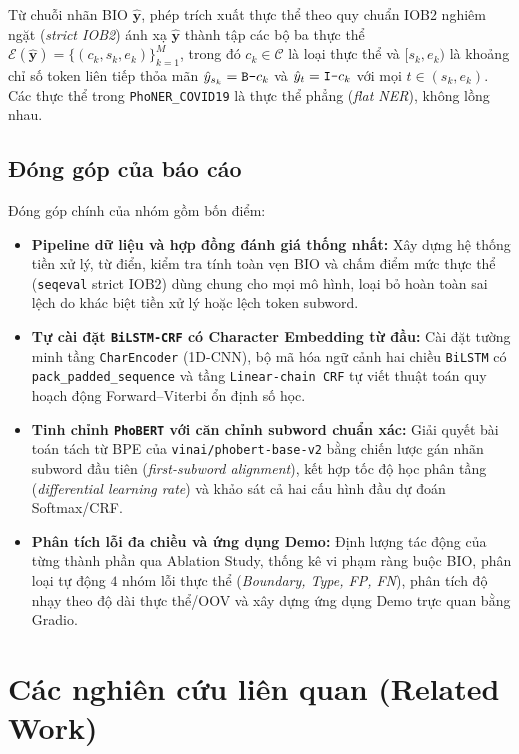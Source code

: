 \documentclass[11pt,a4paper,twocolumn]{article}
\begin{document}
Từ chuỗi nhãn BIO $\hat{\mathbf{y}}$, phép trích xuất thực thể theo quy chuẩn IOB2 nghiêm ngặt (\textit{strict IOB2}) ánh xạ $\hat{\mathbf{y}}$ thành tập các bộ ba thực thể $\mathcal{E}(\hat{\mathbf{y}}) = \{(c_k, s_k, e_k)\}_{k=1}^{M}$, trong đó $c_k \in \mathcal{C}$ là loại thực thể và $[s_k, e_k)$ là khoảng chỉ số token liên tiếp thỏa mãn $\hat{y}_{s_k} = \text{\texttt{B-}}c_k$ và $\hat{y}_t = \text{\texttt{I-}}c_k$ với mọi $t \in (s_k, e_k)$. Các thực thể trong \texttt{PhoNER\_COVID19} là thực thể phẳng (\textit{flat NER}), không lồng nhau.

\subsection{Đóng góp của báo cáo}
Đóng góp chính của nhóm gồm bốn điểm:
\begin{itemize}
  \item \textbf{Pipeline dữ liệu và hợp đồng đánh giá thống nhất:} Xây dựng hệ thống tiền xử lý, từ điển, kiểm tra tính toàn vẹn BIO và chấm điểm mức thực thể (\texttt{seqeval} strict IOB2) dùng chung cho mọi mô hình, loại bỏ hoàn toàn sai lệch do khác biệt tiền xử lý hoặc lệch token subword.
  \item \textbf{Tự cài đặt \texttt{BiLSTM-CRF} có Character Embedding từ đầu:} Cài đặt tường minh tầng \texttt{CharEncoder} (1D-CNN), bộ mã hóa ngữ cảnh hai chiều \texttt{BiLSTM} có \texttt{pack\_padded\_sequence} và tầng \texttt{Linear-chain CRF} tự viết thuật toán quy hoạch động Forward--Viterbi ổn định số học.
  \item \textbf{Tinh chỉnh \texttt{PhoBERT} với căn chỉnh subword chuẩn xác:} Giải quyết bài toán tách từ BPE của \texttt{vinai/phobert-base-v2} bằng chiến lược gán nhãn subword đầu tiên (\textit{first-subword alignment}), kết hợp tốc độ học phân tầng (\textit{differential learning rate}) và khảo sát cả hai cấu hình đầu dự đoán Softmax/CRF.
  \item \textbf{Phân tích lỗi đa chiều và ứng dụng Demo:} Định lượng tác động của từng thành phần qua Ablation Study, thống kê vi phạm ràng buộc BIO, phân loại tự động $4$ nhóm lỗi thực thể (\textit{Boundary, Type, FP, FN}), phân tích độ nhạy theo độ dài thực thể/OOV và xây dựng ứng dụng Demo trực quan bằng Gradio.
\end{itemize}

\section{Các nghiên cứu liên quan (Related Work)}
\label{sec:related}
\end{document}
